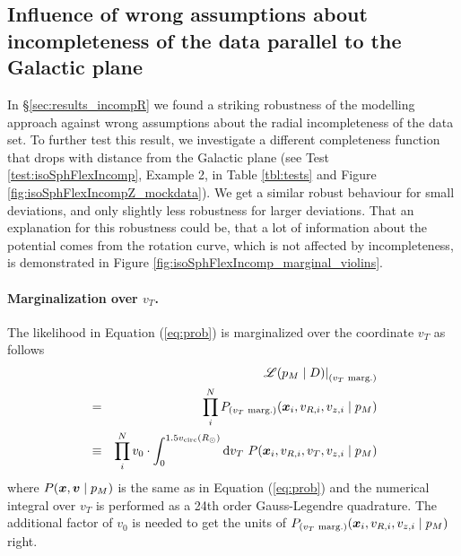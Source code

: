 \subsection{Influence of wrong assumptions about incompleteness of the data parallel to the Galactic plane} \label{sec:incompZ}

In \S\ref{sec:results_incompR} we found a striking robustness of the \RM modelling approach against wrong assumptions about the radial incompleteness of the data set. To further test this result, we investigate a different completeness function that drops with distance from the Galactic plane (see Test \ref{test:isoSphFlexIncomp}, Example 2, in Table \ref{tbl:tests} and Figure \ref{fig:isoSphFlexIncompZ_mockdata}). We get a similar robust behaviour for small deviations, and only slightly less robustness for larger deviations. That an explanation for this robustness could be, that a lot of information about the potential comes from the rotation curve, which is not affected by incompleteness, is demonstrated in Figure \ref{fig:isoSphFlexIncomp_marginal_violins}.

\paragraph{Marginalization over $v_T$.} The likelihood in Equation (\ref{eq:prob}) is marginalized over the coordinate $v_T$ as follows
\begin{eqnarray*}
&&\left. \mathscr{L}(p_M \mid D)\right|_\text{($v_T$ marg.)}\\
&=& \prod_i^N P_\text{($v_T$ marg.)} (\boldsymbol{x}_i,v_{R,i},v_{z,i} \mid p_M)\\
&\equiv& \prod_i^N v_0 \cdot \int_0^{1.5v_\text{circ}(R_\odot)} \mathop{}\!\mathrm{d} v_T \ P(\boldsymbol{x}_i,v_{R,i},v_{T},v_{z,i} \mid p_M )
\end{eqnarray*}
where $P(\boldsymbol{x},\boldsymbol{v} \mid p_M)$ is the same as in Equation (\ref{eq:prob}) and the numerical integral over $v_T$ is performed as a 24th order Gauss-Legendre quadrature. The additional factor of $v_0$ is needed to get the units of $P_\text{($v_T$ marg.)} (\boldsymbol{x}_i,v_{R,i},v_{z,i} \mid p_M)$ right.


